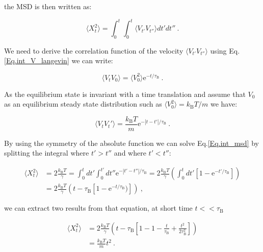 
the \gls{MSD} is then written as:

\begin{equation}
	\langle X_t ^ 2 \rangle  = \int _0 ^ {t} \int _0 ^{t} \langle V_{t'}V_{t''} \rangle dt'dt'' ~.
	\label{Eq.int_msd}
\end{equation}

We need to derive the correlation function of the velocity $ \langle V_{t'}V_{t''} \rangle $ using Eq.\ref{Eq.int_V_langevin} we can write:

\begin{equation}
	\langle V_t V_0 \rangle = \langle V_0 ^2 \rangle \mathrm{e}^{-t/\tau_{\mathrm{B}}}~.
\end{equation}

As the equilibrium state is invariant with a time translation and assume that $V_0$ as an equilibrium steady state distribution such as $\langle V_0^2 \rangle = k_\mathrm{B} T / m$ we have:

\begin{equation}
	\langle V_t V_t' \rangle = \frac{k_\mathrm{B}T}{m} \mathrm{e}^{-|t-t'|/\tau_{\mathrm{B}}}~.
\end{equation}

By using the symmetry of the absolute function we can solve Eq.\ref{Eq.int_msd} by splitting the integral where $t'>t''$ and where $ t' < t''$:

\begin{equation}
	\begin{aligned}
	\langle X_t ^2 \rangle & =   2 \frac{k_\mathrm{B}T}{\gamma} = \int _0 ^t dt' \int _0 ^{t'} dt'' \mathrm{e} ^ {- |t' - t''| / \tau_\mathrm{B}} = 2 \frac{k_\mathrm{B}T}{\gamma} \left( \int_0 ^t dt' \left[1 - \mathrm{e}^{-t'/\tau_\mathrm{B}} \right] \right) \\
	& = 2 \frac{k_\mathrm{B} T}{\gamma} \left( t - \tau_\mathrm{B} \left[ 1 - \mathrm{e}^{-t/\tau_\mathrm{B}}) \right] \right) ~,
	\end{aligned}
\end{equation}

we can extract two results from that equation, at short time $t << \tau_\mathrm{B}$

\begin{equation}
	\begin{aligned}
	\langle X_t ^2 \rangle & =  2 \frac{k_\mathrm{B} T}{\gamma} \left( t - \tau_\mathrm{B} \left[ 1 - 1 - \frac{t}{\tau_\mathrm{B}} + \frac{t^2}{ 2 \tau_\mathrm{B} ^2}\right]         \right) \\
	& = \frac{k_\mathrm{B} T}{m} t^2 ~.
	\end{aligned}
\end{equation}


